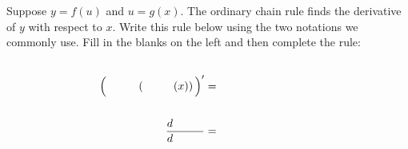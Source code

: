 Suppose $y = f(u)$ and $u = g(x)$.  The ordinary chain rule finds the derivative of $y$ with respect to $x$.  Write this rule below using the two notations we commonly use.  Fill in the blanks on the left and then complete the rule:
\newcommand{\und}{\underline{\phantom{XXX}}}
{\large
\begin{align*}
  &\strut \\
  \Big(\phantom{XXX}\left(\phantom{XXX}(x)\right)\Big)' &= \phantom{dlkfj akdsfj akldsf} \\
  &\strut \\
  \frac{d\phantom{XXX}}{d\phantom{XXX}} &= 
\end{align*}
}
